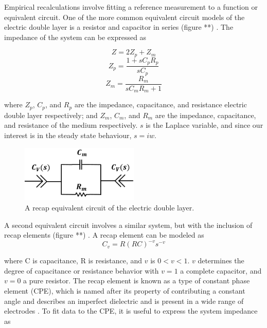 \par Empirical recalculations involve fitting a reference measurement to a function or equivalent circuit. One of the more common equivalent circuit models of the electric double layer is a resistor and capacitor in series (figure **) \cite{ishai-19}. The impedance of the system can be expressed as

\begin{equation}[h]
    Z = 2Z_p + Z_m
\end{equation}
\begin{equation}
    Z_p = \frac{1 + sC_pR_p}{sC_p}
\end{equation}
\begin{equation}
    Z_m = \frac{R_m}{sC_mR_m+1}
\end{equation}

\noindent where $Z_p$, $C_p$, and $R_p$ are the impedance, capacitance, and resistance electric double layer respectively; and $Z_m$, $C_m$, and $R_m$ are the impedance, capacitance, and resistance of the medium respectively. $s$ is the Laplace variable, and since our interest is in the steady state behaviour, $s = iw$.

\begin{figure}[h]
    \centering
    \includegraphics[width=0.5\textwidth]{images/edl_recap_equiv.png}
    \caption{A recap equivalent circuit of the electric double layer.}
    \label{fig:edl_cap_equiv}
\end{figure}


\par A second equivalent circuit involves a similar system, but with the inclusion of recap elements (figure **) \cite{ishai-19}. A recap element can be modeled as 
\begin{equation}
    C_v = R(RC)^{-v}s^{-v}
\end{equation}

\noindent where C is capacitance, R is resistance, and $v$ is $0<v<1$. $v$ determines the degree of capacitance or resistance behavior with $v=1$ a complete capacitor, and $v=0$ a pure resistor. The recap element is known as a type of constant phase element (CPE), which is named after its property of contributing a constant angle and describes an imperfect dielectric and is present in a wide range of electrodes \cite{ishai_electrode_2013}. To fit data to the CPE, it is useful to express the system impedance as

